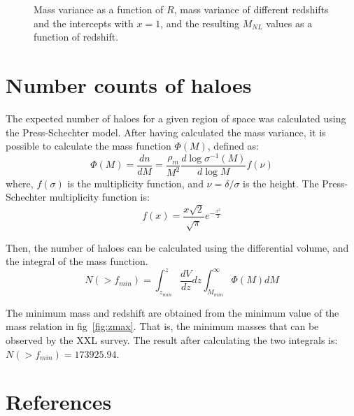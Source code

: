 \documentclass[12pt]{article}
\begin{document}
\begin{figure}[ht]
\begin{subfigure}[b]{0.49\textwidth}
	\end{subfigure}
	\caption{Mass variance as a function of $R$, mass variance of different redshifts and the intercepts with $x=1$, and the resulting $M_{NL}$ values as a function of redshift.}
	\label{fig:nonlinearScale}
\end{figure}



\section{Number counts of haloes}
The expected number of haloes for a given region of space was calculated using the Press-Schechter model. After having calculated the mass variance, it is possible to calculate the mass function $\Phi(M)$, defined as:
\begin{equation}
	\Phi(M) = \frac{dn}{dM} = \frac{\rho_{m}}{M^{2}} \frac{d \log \sigma^{-1}(M)}{d \log M} f(\nu)
	\label{eq:massFunction}
\end{equation}
where, $f(\sigma)$ is the multiplicity function, and $\nu = \delta / \sigma$ is the height. The Press-Schechter multiplicity function is\cite{ref:pressSchechter}:
\begin{equation}
	f(x) = \frac{x \sqrt{2}}{\sqrt{\pi}} e^{-\frac{x^{2}}{2}}
	\label{eq:multiplicityFunction}
\end{equation}

Then, the number of haloes can be calculated using the differential volume, and the integral of the mass function.
\begin{equation}
	N(>f_{min}) = \int_{z_{min}}^{z} \frac{dV}{dz} dz \int_{M_{min}}^{\infty} \Phi(M) dM
	\label{eq:haloCount}
\end{equation}

The minimum mass and redshift are obtained from the minimum value of the mass relation in fig~\ref{fig:zmax}. That is, the minimum masses that can be observed by the XXL survey. The result after calculating the two integrals is: $N(>f_{min}) = 173925.94$.


\section*{References}
\printbibliography[heading=none]
\end{document}
